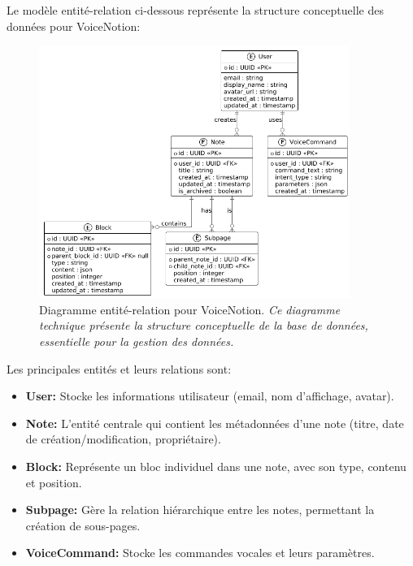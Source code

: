    Le modèle entité-relation ci-dessous représente la structure conceptuelle des données pour VoiceNotion:
    
        \begin{figure}[htbp]
        \centering
        \includegraphics[width=0.9\textwidth]{assets/docs/voicenotion_er_diagram.png}
        \caption{Diagramme entité-relation pour VoiceNotion. \newline\textit{Ce diagramme technique présente la structure conceptuelle de la base de données, essentielle pour la gestion des données.}}
        \label{fig:er_diagram}
    \end{figure}
    
    Les principales entités et leurs relations sont:
    
    \begin{itemize}
        \item \textbf{User:} Stocke les informations utilisateur (email, nom d'affichage, avatar).
        
        \item \textbf{Note:} L'entité centrale qui contient les métadonnées d'une note (titre, date de création/modification, propriétaire).
        
        \item \textbf{Block:} Représente un bloc individuel dans une note, avec son type, contenu et position.
        
        \item \textbf{Subpage:} Gère la relation hiérarchique entre les notes, permettant la création de sous-pages.
        
        \item \textbf{VoiceCommand:} Stocke les commandes vocales et leurs paramètres.
    \end{itemize}
    
